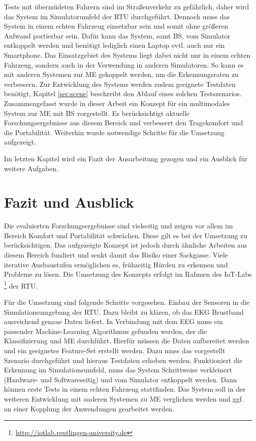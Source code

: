 {Tests mit übermüdeten Fahrern sind im Straßenverkehr zu gefährlich, daher wird das System im Simulatorumfeld der \acl{RTU} durchgeführt. Dennoch muss das System in einem echten Fahrzeug einsetzbar sein und somit ohne größeren Aufwand portierbar sein. Dafür kann das System, samt \acl{BS}, vom Simulator entkoppelt werden und benötigt lediglich einen Laptop evtl. auch nur ein Smartphone. Das Einsatzgebiet des Systems liegt dabei nicht nur in einem echten Fahrzeug, sondern auch in der Verwendung in anderen Simulatoren. So kann es mit anderen Systemen zur \acl{ME} gekoppelt werden, um die Erkennungsraten zu verbessern.
Zur Entwicklung des Systems werden zudem geeignete Testdaten benötigt, Kapitel \ref{sec:scene} beschreibt den Ablauf eines solchen Testszenarios. \\

Zusammengefasst wurde in dieser Arbeit ein Konzept für ein multimodales System zur  \acl{ME} mit \acl{BS} vorgestellt. Es berücksichtigt aktuelle Forschungsergebnisse aus diesem Bereich und verbessert den Tragekomfort und die Portabilität. Weiterhin wurde notwendige Schritte für die Umsetzung aufgezeigt.

Im letzten Kapitel wird ein Fazit der Ausarbeitung gezogen und ein Ausblick für weitere Aufgaben.

\section{Fazit und Ausblick}
\label{chap:outro}
Die evaluierten Forschungsergebnisse sind vielseitig und zeigen vor allem im Bereich Komfort und Portabilität schwächen. Diese gilt es bei der Umsetzung zu berücksichtigen. Das aufgezeigte Konzept ist jedoch durch ähnliche Arbeiten aus diesem Bereich fundiert und senkt damit das Risiko einer Sackgasse. Viele iterative Ausbaustufen ermöglichen es, frühzeitig Hürden zu erkennen und Probleme zu lösen. Die Umsetzung des Konzepts erfolgt im Rahmen des IoT-Labs \footnote{\url{http://iotlab.reutlingen-university.de}} der \acl{RTU}.

Für die Umsetzung sind folgende Schritte vorgesehen. Einbau der Sensoren in die Simulationsumgebung der \acl{RTU}. Dazu bleibt zu klären, ob das EKG Brustband ausreichend genaue Daten liefert. In Verbindung mit dem EEG muss ein passender Machine-Learning Algorithmus gefunden werden, der die Klassifizierung und \acl{ME} durchführt. Hierfür müssen die Daten aufbereitet werden und ein geeignetes Feature-Set erstellt werden. Dazu muss das vorgestellt Szenario durchgeführt und hieraus Testdaten erhoben werden. Funktioniert die Erkennung im Simulationsumfeld, muss das System Schrittweise verkleinert (Hardware- und Softwareseitig) und vom Simulator entkoppelt werden. Dann können erste Tests in einem echten Fahrzeug stattfinden. Das System soll in der weiteren Entwicklung mit anderen Systemen zu \acl{ME} verglichen werden und ggf. an einer Kopplung der Anwendungen gearbeitet werden.\\

}
